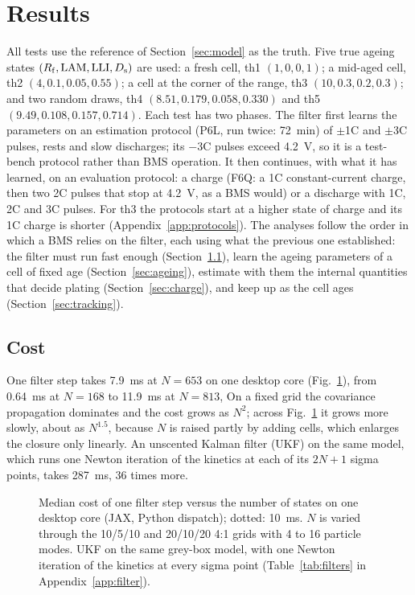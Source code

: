 \documentclass[journal]{IEEEtran}
\newcommand{\LAM}{\mathrm{LAM}}\newcommand{\LLI}{\mathrm{LLI}}\newcommand{\phipl}{\phi_{\mathrm{pl}}}
\begin{document}
\section{Results}\label{sec:results}
All tests use the reference of Section~\ref{sec:model} as the truth. Five true ageing states $(\Rf,\LAM,\LLI,\Ds)$ are used: a fresh cell, th1 $(1,0,0,1)$; a mid-aged cell, th2 $(4,0.1,0.05,0.55)$; a cell at the corner of the range, th3 $(10,0.3,0.2,0.3)$; and two random draws, th4 $(8.51,0.179,0.058,0.330)$ and th5 $(9.49,0.108,0.157,0.714)$. Each test has two phases. The filter first learns the parameters on an estimation protocol (P6L, run twice: \SI{72}{\minute}) of $\pm$1C and $\pm$3C pulses, rests and slow discharges; its $-3$C pulses exceed \SI{4.2}{\volt}, so it is a test-bench protocol rather than BMS operation. It then continues, with what it has learned, on an evaluation protocol: a charge (F6Q: a 1C constant-current charge, then two 2C pulses that stop at \SI{4.2}{\volt}, as a BMS would) or a discharge with 1C, 2C and 3C pulses. For th3 the protocols start at a higher state of charge and its 1C charge is shorter (Appendix~\ref{app:protocols}). The analyses follow the order in which a BMS relies on the filter, each using what the previous one established: the filter must run fast enough (Section~\ref{sec:cost}), learn the ageing parameters of a cell of fixed age (Section~\ref{sec:ageing}), estimate with them the internal quantities that decide plating (Section~\ref{sec:charge}), and keep up as the cell ages (Section~\ref{sec:tracking}).
\subsection{Cost}\label{sec:cost}
One filter step takes \SI{7.9}{\milli\second} at $N=653$ on one desktop core (Fig.~\ref{fig:cost}), from \SI{0.64}{\milli\second} at $N=168$ to \SI{11.9}{\milli\second} at $N=813$, On a fixed grid the covariance propagation dominates and the cost grows as $N^2$; across Fig.~\ref{fig:cost} it grows more slowly, about as $N^{1.5}$, because $N$ is raised partly by adding cells, which enlarges the closure only linearly. An unscented Kalman filter (UKF) on the same model, which runs one Newton iteration of the kinetics at each of its $2N+1$ sigma points, takes \SI{287}{\milli\second}, 36 times more.

\begin{figure}[t]
\centering

\caption{Median cost of one filter step versus the number of states on one desktop core (JAX, Python dispatch); dotted: \SI{10}{\milli\second}. $N$ is varied through the 10/5/10 and 20/10/20 4:1 grids with 4 to 16 particle modes. UKF on the same grey-box model, with one Newton iteration of the kinetics at every sigma point (Table~\ref{tab:filters} in Appendix~\ref{app:filter}).}
\label{fig:cost}
\end{figure}
\end{document}
